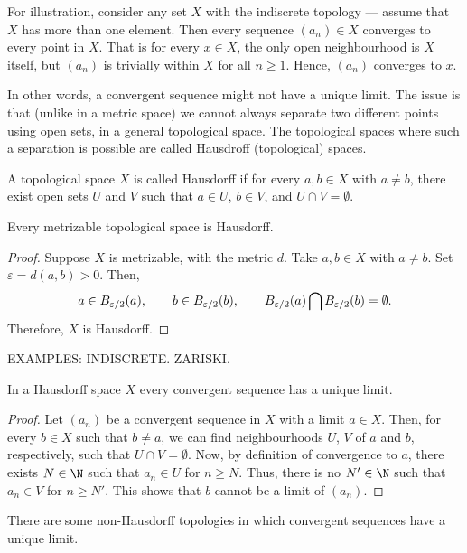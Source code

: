 For illustration, consider any set $X$ with the indiscrete topology --- assume that $X$ has more than one element. Then every sequence $(a_n) \in X$ converges to every point in $X$. That is for every $x \in X$, the only open neighbourhood is $X$ itself, but $(a_n)$ is trivially within $X$ for all $n \geq 1$. Hence, $(a_n)$ converges to $x$.

In other words, a convergent sequence might not have a unique limit. The issue is that (unlike in a metric space) we cannot always separate two different points using open sets, in a general topological space. The topological spaces where such a separation is possible are called Hausdroff (topological) spaces.
\begin{ndfn}
  A topological space $X$ is called Hausdorff if for every $a, b \in X$ with $a \neq b$, there exist open sets $U$ and $V$ such that $a \in U$, $b \in V$, and $U \cap V = \emptyset$.
\end{ndfn}

\begin{nlemma}
  Every metrizable topological space is Hausdorff.
\end{nlemma}
\begin{proof}
  Suppose $X$ is metrizable, with the metric $d$. Take $a, b \in X$ with $a \neq b$. Set $\varepsilon = d(a,b) > 0$. Then,
  \begin{equation*}
    a \in B_{\varepsilon/2}(a),
    \qquad
    b \in B_{\varepsilon/2}(b),
    \qquad
    B_{\varepsilon/2}(a) \bigcap B_{\varepsilon/2}(b) = \emptyset.
  \end{equation*}
  Therefore, $X$ is Hausdorff.
\end{proof}

EXAMPLES: INDISCRETE. ZARISKI.

\begin{nlemma}
  In a Hausdorff space $X$ every convergent sequence has a unique limit.
\end{nlemma}
\begin{proof}
  Let $(a_n)$ be a convergent sequence in $X$ with a limit $a \in X$. Then, for every $b \in X$ such that $b \neq a$, we can find neighbourhoods $U$, $V$ of $a$ and $b$, respectively, such that $U \cap V = \emptyset$. Now, by definition of convergence to $a$, there exists $N \in \N$ such that $a_n \in U$ for $n \geq N$. Thus, there is no $N' \in \N$ such that $a_n \in V$ for $n \geq N'$. This shows that $b$ cannot be a limit of $(a_n)$.
\end{proof}
There are some non-Hausdorff topologies in which convergent sequences have a unique limit.

